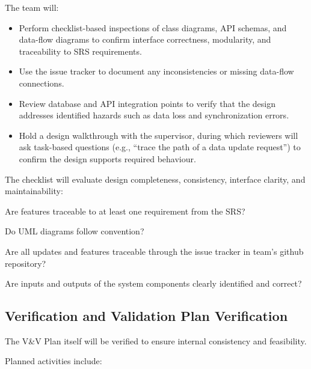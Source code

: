 \documentclass[12pt, titlepage]{article}
\begin{document}
The team will:

\begin{itemize}
  \item Perform checklist-based inspections of class diagrams, API schemas, and
  data-flow diagrams to confirm interface correctness, modularity, and
  traceability to SRS requirements.

  \item Use the issue tracker to document any inconsistencies or missing
  data-flow connections.

  \item Review database and API integration points to verify that the design
  addresses identified hazards such as data loss and synchronization errors.

  \item Hold a design walkthrough with the supervisor, during which reviewers
  will ask task-based questions (e.g., ``trace the path of a data update
  request'') to confirm the design supports required behaviour.
\end{itemize}

The checklist will evaluate design completeness, consistency, interface
clarity, and maintainability:
\begin{todolist}
  \item Are features traceable to at least one requirement from the SRS?
  \item Do UML diagrams follow convention?
  \item Are all updates and features traceable through the issue tracker in team's github repository?
  \item Are inputs and outputs of the system components clearly identified and correct?
\end{todolist}
\subsection{Verification and Validation Plan Verification}
\label{subsec:vnv-plan-verification}

The V\&V Plan itself will be verified to ensure internal consistency and
feasibility.

Planned activities include:
\end{document}
